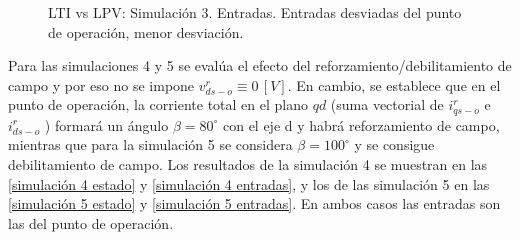 \documentclass[a4paper, 10pt, onecolumn,journal]{ieeeconf}
\begin{document}
\begin{figure}[H]
	\centering
	\begin{adjustbox}{scale=0.7,max width=\columnwidth}
	\end{adjustbox}
	\caption{LTI vs LPV: Simulación 3. Entradas. Entradas desviadas del punto de operación, menor desviación.}
	\label{simulación 3 entradas}
\end{figure}

Para las simulaciones 4 y 5 se evalúa el efecto del reforzamiento/debilitamiento de campo y por eso no se impone $v^r_{ds-o} \equiv 0\, \left[V\right]$.
En cambio, se establece que en el punto de operación, la corriente total en el plano $qd$ (suma vectorial de $i^r_{qs-o}$ e $i^r_{ds-o}$ ) formará un ángulo $\beta = 80^\circ$ con el eje d y habrá reforzamiento de campo,
mientras que para la simulación 5 se considera  $\beta = 100^\circ$ y se consigue debilitamiento de campo. Los resultados
de la simulación 4 se muestran en las \cref{simulación 4 estado}  y \cref{simulación 4 entradas}, y los de las simulación 5 en las \cref{simulación 5 estado} y \cref{simulación 5 entradas}.  En ambos casos las entradas son las del punto de operación.
\end{document}
